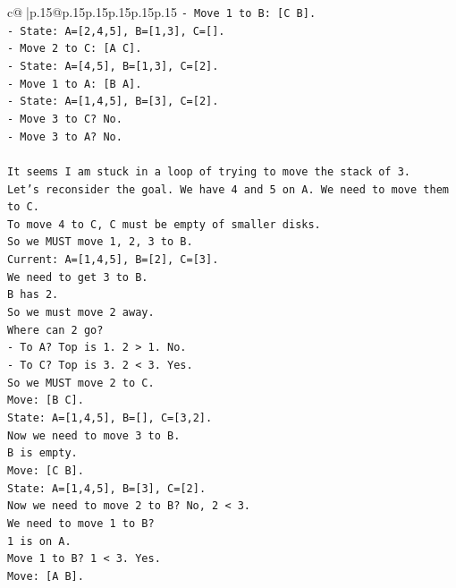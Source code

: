 \documentclass{article}
\begin{document}
{\begin{supertabular}{c@{$\;$}|p{.15\linewidth}@{}p{.15\linewidth}p{.15\linewidth}p{.15\linewidth}p{.15\linewidth}p{.15\linewidth}}
{{{\texttt{{-} Move 1 to B: {[}C B{]}.} \\
\texttt{{-} State: A={[}2,4,5{]}, B={[}1,3{]}, C={[}{]}.} \\
\texttt{{-} Move 2 to C: {[}A C{]}.} \\
\texttt{{-} State: A={[}4,5{]}, B={[}1,3{]}, C={[}2{]}.} \\
\texttt{{-} Move 1 to A: {[}B A{]}.} \\
\texttt{{-} State: A={[}1,4,5{]}, B={[}3{]}, C={[}2{]}.} \\
\texttt{{-} Move 3 to C? No.} \\
\texttt{{-} Move 3 to A? No.} \\
\\ 
\texttt{It seems I am stuck in a loop of trying to move the stack of 3.} \\
\texttt{Let's reconsider the goal. We have 4 and 5 on A. We need to move them to C.} \\
\texttt{To move 4 to C, C must be empty of smaller disks.} \\
\texttt{So we MUST move 1, 2, 3 to B.} \\
\texttt{Current: A={[}1,4,5{]}, B={[}2{]}, C={[}3{]}.} \\
\texttt{We need to get 3 to B.} \\
\texttt{B has 2.} \\
\texttt{So we must move 2 away.} \\
\texttt{Where can 2 go?} \\
\texttt{{-} To A? Top is 1. 2 > 1. No.} \\
\texttt{{-} To C? Top is 3. 2 < 3. Yes.} \\
\texttt{So we MUST move 2 to C.} \\
\texttt{Move: {[}B C{]}.} \\
\texttt{State: A={[}1,4,5{]}, B={[}{]}, C={[}3,2{]}.} \\
\texttt{Now we need to move 3 to B.} \\
\texttt{B is empty.} \\
\texttt{Move: {[}C B{]}.} \\
\texttt{State: A={[}1,4,5{]}, B={[}3{]}, C={[}2{]}.} \\
\texttt{Now we need to move 2 to B? No, 2 < 3.} \\
\texttt{We need to move 1 to B?} \\
\texttt{1 is on A.} \\
\texttt{Move 1 to B? 1 < 3. Yes.} \\
\texttt{Move: {[}A B{]}.} \\
}}}
\end{supertabular}}
\end{document}
